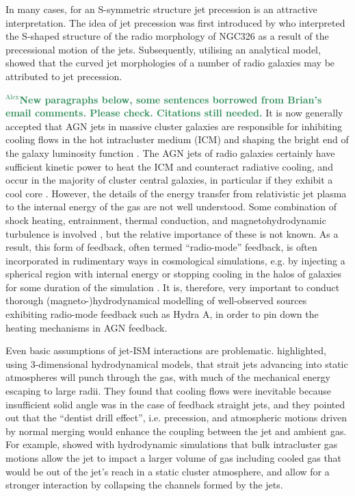 \documentclass[useAMS, usenatbib]{mn2e}
\newcommand{\noteA}[1]{\textbf{\textcolor{SeaGreen}{$^\mathrm{Alex}$#1}}}
\begin{document}
In many cases, for an S-symmetric structure jet precession is an attractive interpretation. The idea of jet precession was first introduced by \citet{ekers78} who interpreted the S-shaped structure of the radio morphology of NGC326 as a result of the precessional motion of the jets. Subsequently, utilising an analytical model, \citet{gower82} showed that the curved jet morphologies of a number of radio galaxies may be attributed to jet precession.

\noteA{New paragraphs below, some sentences borrowed from Brian's email comments. Please check. Citations still needed.}
It is now generally accepted that AGN jets in massive cluster galaxies are responsible for inhibiting cooling flows in the hot intracluster medium (ICM) and shaping the bright end of the galaxy luminosity function \citep{croton2006a, fabian2012a, mcnamara2012a}. The AGN jets of radio galaxies certainly have sufficient kinetic power to heat the ICM and counteract radiative cooling, and occur in the majority of cluster central galaxies, in particular if they exhibit a cool core \citep{mittal2009a}  . However, the details of the energy transfer from relativistic jet plasma to the internal energy of the gas are not well understood. Some combination of shock heating, entrainment, thermal conduction, and magnetohydrodynamic turbulence is involved \citep{}, but the relative importance of these is not known. As a result, this form of feedback, often termed ``radio-mode'' feedback, is often incorporated in rudimentary ways in cosmological simulations, e.g. by injecting a spherical region with internal energy or stopping cooling in the halos of galaxies for some duration of the simulation \citep{}. It is, therefore, very important to conduct thorough (magneto-)hydrodynamical modelling of well-observed sources exhibiting radio-mode feedback such as Hydra A, in order to pin down the heating mechanisms in AGN feedback.

Even basic assumptions of jet-ISM interactions are problematic. \cite{vernaleo2006a} highlighted, using 3-dimensional hydrodynamical models, that strait jets advancing into static atmospheres will punch through the gas, with much of the mechanical energy escaping to large radii. They found that cooling flows were inevitable because insufficient solid angle was in the case of feedback straight jets, and they pointed out that the ``dentist drill effect'', i.e. precession, and atmospheric motions driven by normal merging would enhance the coupling between the jet and ambient gas. For example, \citet{heinz2006a} showed with hydrodynamic simulations that bulk intracluster gas motions allow the jet to impact a larger volume of gas including cooled gas that would be out of the jet's reach in a static cluster atmosphere, and allow for a stronger interaction by collapsing the channels formed by the jets. 
\end{document}
